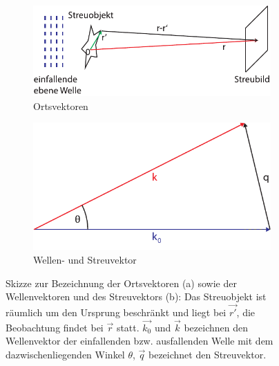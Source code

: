 \begin{figure}
	\centering
	\begin{subfigure}[b]{0.49\textwidth}
		\includegraphics[width=\textwidth]{images/bornr.pdf}
		\caption{Ortsvektoren}
		\label{fig:bornr}
	\end{subfigure}
	\begin{subfigure}[b]{0.49\textwidth}
		\includegraphics[width=\textwidth]{images/bornq.pdf}
		\caption{Wellen- und Streuvektor}
		\label{fig:bornq}
	\end{subfigure}
	\caption[Geometrie bei Born-Näherung]{Skizze zur Bezeichnung der Ortsvektoren (a) sowie
		 der Wellenvektoren und des Streuvektors (b): Das Streuobjekt ist räumlich um den Ursprung beschränkt und liegt bei $\vec{r'}$, die Beobachtung findet bei $\vec{r}$ statt. $\vec{k_{0}}$ und $\vec{k}$ bezeichnen den Wellenvektor der einfallenden bzw. ausfallenden Welle mit dem dazwischenliegenden Winkel $\theta$, $\vec{q}$ bezeichnet den Streuvektor.}
\end{figure} 


